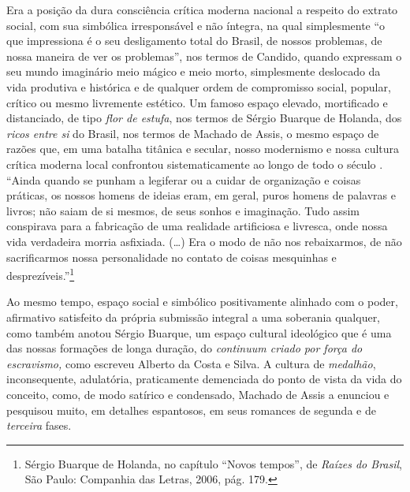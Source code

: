 Era a posição da dura consciência crítica moderna nacional a respeito do
extrato social, com sua simbólica irresponsável e não íntegra, na qual
simplesmente ``o que impressiona é o seu desligamento total do Brasil,
de nossos problemas, de nossa maneira de ver os problemas'', nos termos
de Candido, quando expressam o seu mundo imaginário meio mágico e meio
morto, simplesmente deslocado da vida produtiva e histórica e de
qualquer ordem de compromisso social, popular, crítico ou mesmo
livremente estético. Um famoso espaço elevado, mortificado e
distanciado, de tipo \emph{flor de estufa}, nos termos de Sérgio Buarque
de Holanda, dos \emph{ricos entre si} do Brasil, nos termos de Machado
de Assis, o mesmo espaço de razões que, em uma batalha titânica e
secular, nosso modernismo e nossa cultura crítica moderna local
confrontou sistematicamente ao longo de todo o século . ``Ainda quando
se punham a legiferar ou a cuidar de organização e coisas práticas, os
nossos homens de ideias eram, em geral, puros homens de palavras e
livros; não saiam de si mesmos, de seus sonhos e imaginação. Tudo assim
conspirava para a fabricação de uma realidade artificiosa e livresca,
onde nossa vida verdadeira morria asfixiada. (\ldots{}) Era o modo de não nos
rebaixarmos, de não sacrificarmos nossa personalidade no contato de
coisas mesquinhas e desprezíveis.''\footnote{Sérgio Buarque de Holanda,
  no capítulo ``Novos tempos'', de \emph{Raízes do Brasil}, São Paulo:
  Companhia das Letras, 2006, pág. 179.}

Ao mesmo tempo, espaço social e simbólico positivamente alinhado com o
poder, afirmativo satisfeito da própria submissão integral a uma
soberania qualquer, como também anotou Sérgio Buarque, um espaço
cultural ideológico que é uma das nossas formações de longa duração, do
\emph{continuum criado por força do escravismo,} como escreveu Alberto
da Costa e Silva. A cultura de \emph{medalhão}, inconsequente,
adulatória, praticamente demenciada do ponto de vista da vida do
conceito, como, de modo satírico e condensado, Machado de Assis a
enunciou e pesquisou muito, em detalhes espantosos, em seus romances de
segunda e de \emph{terceira} fases.

